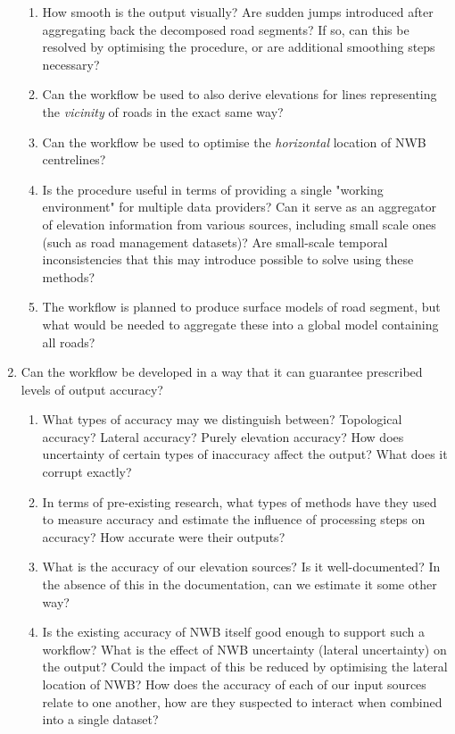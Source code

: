 \begin{enumerate}
\begin{enumerate}
        \item How smooth is the output visually? Are sudden jumps introduced after aggregating back the decomposed road segments? If so, can this be resolved by optimising the procedure, or are additional smoothing steps necessary?
        \item Can the workflow be used to also derive elevations for lines representing the \textit{vicinity} of roads in the exact same way?
        \item Can the workflow be used to optimise the \textit{horizontal} location of NWB centrelines?
        \item Is the procedure useful in terms of providing a single "working environment" for multiple data providers? Can it serve as an aggregator of elevation information from various sources, including small scale ones (such as road management datasets)? Are small-scale temporal inconsistencies that this may introduce possible to solve using these methods?
        \item The workflow is planned to produce surface models of road segment, but what would be needed to aggregate these into a global model containing all roads?
    \end{enumerate}
    \item Can the workflow be developed in a way that it can guarantee prescribed levels of output accuracy?
    \begin{enumerate}
        \item What types of accuracy may we distinguish between? Topological accuracy? Lateral accuracy? Purely elevation accuracy? How does uncertainty of certain types of inaccuracy affect the output? What does it corrupt exactly?
        \item In terms of pre-existing research, what types of methods have they used to measure accuracy and estimate the influence of processing steps on accuracy? How accurate were their outputs?
        \item What is the accuracy of our elevation sources? Is it well-documented? In the absence of this in the documentation, can we estimate it some other way?
        \item Is the existing accuracy of NWB itself good enough to support such a workflow? What is the effect of NWB uncertainty (lateral uncertainty) on the output? Could the impact of this be reduced by optimising the lateral location of NWB?
        \tiem How does the accuracy of each of our input sources relate to one another, how are they suspected to interact when combined into a single dataset?

\end{enumerate}
\end{enumerate}
